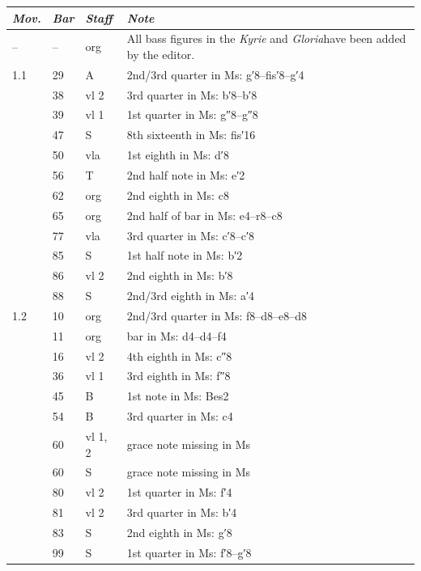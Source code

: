 \documentclass[parskip=full]{scrreprt}
\begin{document}
\bigskip

\begin{longtable}{lll L{10cm}}
	\toprule
	\itshape Mov. & \itshape Bar & \itshape Staff & \itshape Note \\
	\midrule \endhead
	–   & –   & org   & All bass figures in the \textit{Kyrie} and \textit{Gloria}\newline have been added by the editor. \\
	1.1 & 29  & A     & 2nd/3rd quarter in Ms: g′8–fis′8–g′4 \\
	    & 38  & vl 2  & 3rd quarter in Ms: b′8–b′8 \\
	    & 39  & vl 1  & 1st quarter in Ms: g″8–g″8 \\
	    & 47  & S     & 8th sixteenth in Ms: fis′16 \\
	    & 50  & vla   & 1st eighth in Ms: d′8 \\
	    & 56  & T     & 2nd half note in Ms: e′2 \\
	    & 62  & org   & 2nd eighth in Ms: c8 \\
	    & 65  & org   & 2nd half of bar in Ms: e4–r8–c8 \\
	    & 77  & vla   & 3rd quarter in Ms: c′8–c′8 \\
	    & 85  & S     & 1st half note in Ms: b′2 \\
	    & 86  & vl 2  & 2nd eighth in Ms: b′8 \\
	    & 88  & S     & 2nd/3rd eighth in Ms: a′4 \\
	1.2 & 10  & org   & 2nd/3rd quarter in Ms: f8–d8–e8–d8 \\
	    & 11  & org   & bar in Ms: d4–d4–f4 \\
	    & 16  & vl 2  & 4th eighth in Ms: c″8 \\
	    & 36  & vl 1  & 3rd eighth in Ms: f″8 \\
	    & 45  & B     & 1st note in Ms: Bes2 \\
	    & 54  & B     & 3rd quarter in Ms: c4 \\
	    & 60  & vl 1, 2 & grace note missing in Ms \\
	    & 60  & S     & grace note missing in Ms \\
	    & 80  & vl 2  & 1st quarter in Ms: f′4 \\
	    & 81  & vl 2  & 3rd quarter in Ms: b′4 \\
	    & 83  & S     & 2nd eighth in Ms: g′8 \\
	    & 99  & S     & 1st quarter in Ms: f′8–g′8 \\

\end{longtable}
\end{document}
